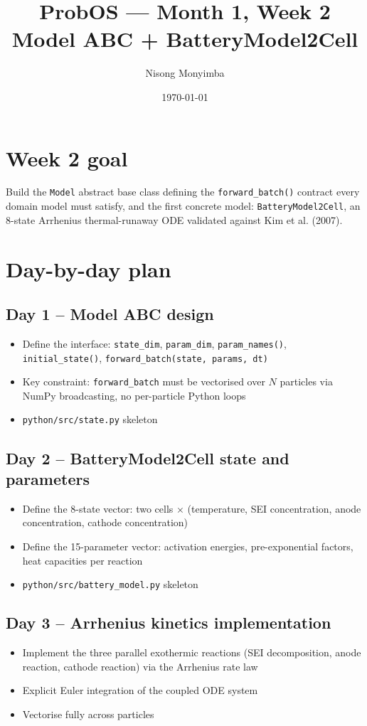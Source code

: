 \documentclass[11pt]{article}
\title{ProbOS --- Month 1, Week 2\\Model ABC + BatteryModel2Cell}
\author{Nisong Monyimba}
\date{\today}
\begin{document}
\maketitle

\section*{Week 2 goal}
Build the \texttt{Model} abstract base class defining the
\texttt{forward\_batch()} contract every domain model must satisfy, and
the first concrete model: \texttt{BatteryModel2Cell}, an 8-state
Arrhenius thermal-runaway ODE validated against Kim et al. (2007).

\section*{Day-by-day plan}

\subsection*{Day 1 -- Model ABC design}
\begin{itemize}[leftmargin=*]
  \item Define the interface: \texttt{state\_dim}, \texttt{param\_dim},
    \texttt{param\_names()}, \texttt{initial\_state()},
    \texttt{forward\_batch(state, params, dt)}
  \item Key constraint: \texttt{forward\_batch} must be vectorised over
    $N$ particles via NumPy broadcasting, no per-particle Python loops
  \item \texttt{python/src/state.py} skeleton
\end{itemize}

\subsection*{Day 2 -- BatteryModel2Cell state and parameters}
\begin{itemize}[leftmargin=*]
  \item Define the 8-state vector: two cells $\times$ (temperature,
    SEI concentration, anode concentration, cathode concentration)
  \item Define the 15-parameter vector: activation energies,
    pre-exponential factors, heat capacities per reaction
  \item \texttt{python/src/battery\_model.py} skeleton
\end{itemize}

\subsection*{Day 3 -- Arrhenius kinetics implementation}
\begin{itemize}[leftmargin=*]
  \item Implement the three parallel exothermic reactions (SEI
    decomposition, anode reaction, cathode reaction) via the Arrhenius
    rate law
  \item Explicit Euler integration of the coupled ODE system
  \item Vectorise fully across particles
\end{itemize}
\end{document}
